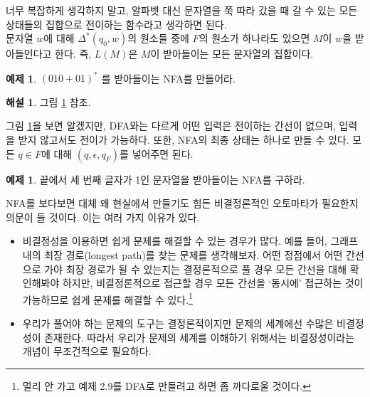 \documentclass[b5paper, 11pt]{book}
\theoremstyle{definition}
\newtheorem{ex}[defn]{예제}
\newtheorem*{ans*}{해설}
\begin{document}
너무 복잡하게 생각하지 말고, 알파벳 대신 문자열을 쭉 따라 갔을 때 갈 수 있는 모든 상태들의 집합으로 전이하는 함수라고 생각하면 된다.\\
문자열 $w$에 대해 $\Delta^* (q_0, w)$의 원소들 중에 $F$의 원소가 하나라도 있으면 $M$이 $w$을 받아들인다고 한다. 즉, $L(M)$은 $M$이 받아들이는 모든 문자열의 집합이다. 
\begin{ex}\label{010+01}
    $(010+01)^*$ 를 받아들이는 NFA를 만들어라. 
\end{ex} 
\begin{ans*}
    그림 \ref{(010+01)^*} 참조.
\end{ans*}
\begin{figure}[ht]
    \centering
    \caption{} 
    \label{(010+01)^*}
\end{figure}
그림 \ref{(010+01)^*}을 보면 알겠지만, DFA와는 다르게 어떤 입력은 전이하는 간선이 없으며, 입력을 받지 않고서도 전이가 가능하다. 또한, NFA의 최종 상태는 하나로 만들 수 있다. 모든 $q \in F$에 대해 $(q, \epsilon, q_F )$를 넣어주면 된다.
\begin{ex}\label{100nfa}
    끝에서 세 번째 글자가 1인 문자열을 받아들이는 NFA를 구하라. 
\end{ex}
NFA를 보다보면 대체 왜 현실에서 만들기도 힘든 비결정론적인 오토마타가 필요한지 의문이 들 것이다. 이는 여러 가지 이유가 있다.
\begin{itemize}
    \item 비결정성을 이용하면 쉽게 문제를 해결할 수 있는 경우가 많다. 예를 들어, 그래프 내의 최장 경로(longest path)를 찾는 문제를 생각해보자. 어떤 정점에서 어떤 간선으로 가야 최장 경로가 될 수 있는지는 결정론적으로 풀 경우 모든 간선을 대해 확인해봐야 하지만, 비결정론적으로 접근할 경우 모든 간선을 `동시에' 접근하는 것이 가능하므로 쉽게 문제를 해결할 수 있다.\footnote{멀리 안 가고 예제 2.9를 DFA로 만들려고 하면 좀 까다로울 것이다.}
    \item 우리가 풀어야 하는 문제의 도구는 결정론적이지만 문제의 세계에선 수많은 비결정성이 존재한다. 따라서 우리가 문제의 세계를 이해하기 위해서는 비결정성이라는 개념이 무조건적으로 필요하다.
\end{itemize}
\end{document}
